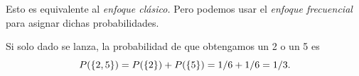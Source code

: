 \begin{observacion}
	Esto es equivalente al \textit{enfoque clásico.} Pero podemos usar el \textit{enfoque frecuencial} para asignar dichas probabilidades.
\end{observacion}


\begin{ejemplo}
	\label{exmp:2.2.12}
	Si solo dado se lanza, la probabilidad de que obtengamos un 2 o un 5 es 
	\[ P(\left\{ 2,5 \right\}) = P(\left\{ 2 \right\}) + P(\{5\}) = 1/6 + 1/6 = 1/3. \]
\end{ejemplo}
